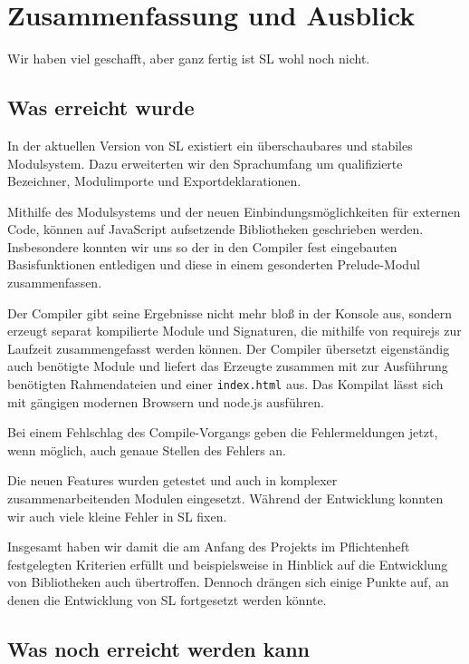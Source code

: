 \documentclass[runningheads]{llncs}
\begin{document}
\section{Zusammenfassung und Ausblick}

Wir haben viel geschafft, aber ganz fertig ist SL wohl noch nicht.

\subsection{Was erreicht wurde}

In der aktuellen Version von SL existiert ein überschaubares und stabiles
Modulsystem. Dazu erweiterten wir den Sprachumfang um qualifizierte Bezeichner,
Modulimporte und Exportdeklarationen.

Mithilfe des Modulsystems und der neuen Einbindungsmöglichkeiten für externen
Code, können auf JavaScript aufsetzende Bibliotheken geschrieben werden.
Insbesondere konnten wir uns so der in den Compiler fest eingebauten
Basisfunktionen entledigen und diese in einem gesonderten Prelude-Modul 
zusammenfassen.

Der Compiler gibt seine Ergebnisse nicht mehr bloß in der Konsole aus, sondern
erzeugt separat kompilierte Module und Signaturen, die mithilfe von requirejs
zur Laufzeit zusammengefasst werden können. Der Compiler übersetzt eigenständig
auch benötigte Module und liefert das Erzeugte zusammen mit zur Ausführung
benötigten Rahmendateien und einer \verb|index.html| aus. Das Kompilat lässt
sich mit gängigen modernen Browsern und node.js ausführen.

Bei einem Fehlschlag des Compile-Vorgangs geben die Fehlermeldungen jetzt,
wenn möglich, auch genaue Stellen des Fehlers an.

Die neuen Features wurden getestet und auch in komplexer zusammenarbeitenden
Modulen eingesetzt. Während der Entwicklung konnten wir auch viele kleine
Fehler in SL fixen.

Insgesamt haben wir damit die am Anfang des Projekts im Pflichtenheft
festgelegten Kriterien erfüllt und beispielsweise in Hinblick auf die
Entwicklung von Bibliotheken auch übertroffen. Dennoch drängen sich einige
Punkte auf, an denen die Entwicklung von SL fortgesetzt werden könnte.

\subsection{Was noch erreicht werden kann}
\end{document}
